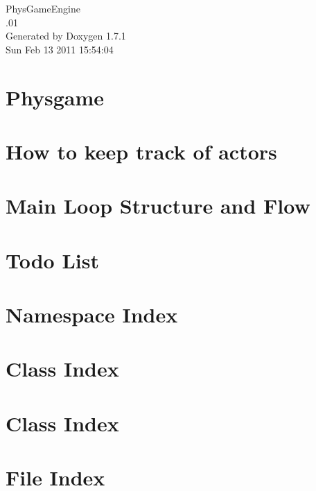 \documentclass[a4paper]{book}
\begin{document}
\hypersetup{pageanchor=false}
\begin{titlepage}
\vspace*{7cm}
\begin{center}
{\Large PhysGameEngine \\[1ex]\large .01 }\\
\vspace*{1cm}
{\large Generated by Doxygen 1.7.1}\\
\vspace*{0.5cm}
{\small Sun Feb 13 2011 15:54:04}\\
\end{center}
\end{titlepage}
\clearemptydoublepage
{}
\tableofcontents
\clearemptydoublepage
{}
\hypersetup{pageanchor=true}
\chapter{Physgame}
\label{index}\hypertarget{index}{}
\chapter{How to keep track of actors}
\label{actorcontainer1}
\hypertarget{actorcontainer1}{}

\chapter{Main Loop Structure and Flow}
\label{mainloop1}
\hypertarget{mainloop1}{}

\chapter{Todo List}
\label{todo}
\hypertarget{todo}{}

\chapter{Namespace Index}

\chapter{Class Index}

\chapter{Class Index}

\chapter{File Index}

\end{document}
